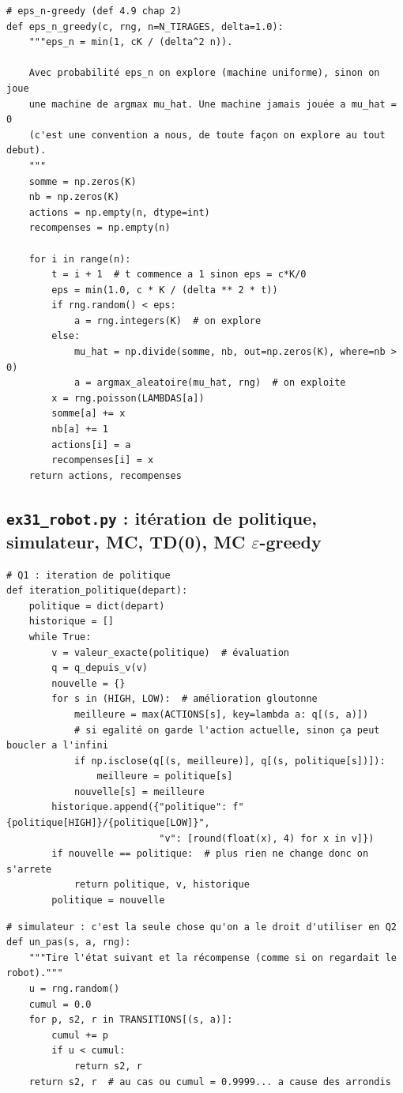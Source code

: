 \documentclass[11pt,a4paper]{article}
\begin{document}
\begin{lstlisting}[firstnumber=79]
# eps_n-greedy (def 4.9 chap 2)
def eps_n_greedy(c, rng, n=N_TIRAGES, delta=1.0):
    """eps_n = min(1, cK / (delta^2 n)).

    Avec probabilité eps_n on explore (machine uniforme), sinon on joue
    une machine de argmax mu_hat. Une machine jamais jouée a mu_hat = 0
    (c'est une convention a nous, de toute façon on explore au tout debut).
    """
    somme = np.zeros(K)
    nb = np.zeros(K)
    actions = np.empty(n, dtype=int)
    recompenses = np.empty(n)

    for i in range(n):
        t = i + 1  # t commence a 1 sinon eps = c*K/0
        eps = min(1.0, c * K / (delta ** 2 * t))
        if rng.random() < eps:
            a = rng.integers(K)  # on explore
        else:
            mu_hat = np.divide(somme, nb, out=np.zeros(K), where=nb > 0)
            a = argmax_aleatoire(mu_hat, rng)  # on exploite
        x = rng.poisson(LAMBDAS[a])
        somme[a] += x
        nb[a] += 1
        actions[i] = a
        recompenses[i] = x
    return actions, recompenses
\end{lstlisting}

\subsection{\texttt{ex31\_robot.py} : itération de politique, simulateur, MC, TD(0), MC $\varepsilon$-greedy}

\begin{lstlisting}[firstnumber=79]
# Q1 : iteration de politique
def iteration_politique(depart):
    politique = dict(depart)
    historique = []
    while True:
        v = valeur_exacte(politique)  # évaluation
        q = q_depuis_v(v)
        nouvelle = {}
        for s in (HIGH, LOW):  # amélioration gloutonne
            meilleure = max(ACTIONS[s], key=lambda a: q[(s, a)])
            # si egalité on garde l'action actuelle, sinon ça peut boucler a l'infini
            if np.isclose(q[(s, meilleure)], q[(s, politique[s])]):
                meilleure = politique[s]
            nouvelle[s] = meilleure
        historique.append({"politique": f"{politique[HIGH]}/{politique[LOW]}",
                           "v": [round(float(x), 4) for x in v]})
        if nouvelle == politique:  # plus rien ne change donc on s'arrete
            return politique, v, historique
        politique = nouvelle
\end{lstlisting}

\begin{lstlisting}[firstnumber=100]
# simulateur : c'est la seule chose qu'on a le droit d'utiliser en Q2
def un_pas(s, a, rng):
    """Tire l'état suivant et la récompense (comme si on regardait le robot)."""
    u = rng.random()
    cumul = 0.0
    for p, s2, r in TRANSITIONS[(s, a)]:
        cumul += p
        if u < cumul:
            return s2, r
    return s2, r  # au cas ou cumul = 0.9999... a cause des arrondis
\end{lstlisting}
\end{document}
